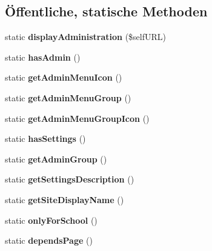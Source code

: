\subsection*{Öffentliche, statische Methoden}
\begin{DoxyCompactItemize}
\item 
\mbox{\label{classoffice365users_a1667c63da47f15aca71ae42a98df0cfe}} 
static {\bfseries display\+Administration} (\$self\+U\+RL)
\item 
\mbox{\label{classoffice365users_aad383208df40382d5503960074c338f7}} 
static {\bfseries has\+Admin} ()
\item 
\mbox{\label{classoffice365users_acc9d0ee56f136a420f36f84388c0e0fb}} 
static {\bfseries get\+Admin\+Menu\+Icon} ()
\item 
\mbox{\label{classoffice365users_a18f7630514a147230b0bd56dae7007ea}} 
static {\bfseries get\+Admin\+Menu\+Group} ()
\item 
\mbox{\label{classoffice365users_a3676ba4fac0067ea4a06026efe9c91eb}} 
static {\bfseries get\+Admin\+Menu\+Group\+Icon} ()
\item 
\mbox{\label{classoffice365users_a9b3fd538cd87f5116adb391b5dfbbd99}} 
static {\bfseries has\+Settings} ()
\item 
\mbox{\label{classoffice365users_a10d8869970e36bbc47cf7c78e143b5e3}} 
static {\bfseries get\+Admin\+Group} ()
\item 
\mbox{\label{classoffice365users_a7369884b3aae8973aae9254a8231adb4}} 
static {\bfseries get\+Settings\+Description} ()
\item 
\mbox{\label{classoffice365users_a86f923a10f6213f00cdc23bf16c65697}} 
static {\bfseries get\+Site\+Display\+Name} ()
\item 
\mbox{\label{classoffice365users_a12688201a57d6ba7dd0d4e591537f9d6}} 
static {\bfseries only\+For\+School} ()
\item 
\mbox{\label{classoffice365users_ab75210bf90680cfb16a4d444b8a19d9d}} 
static {\bfseries depends\+Page} ()
\end{DoxyCompactItemize}
